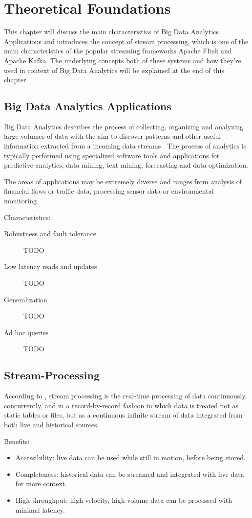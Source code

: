\chapter{Theoretical Foundations}

This chapter will discuss the main characteristics of Big Data Analytics Applications and
introduces the concept of stream processing, which is one of the main characteristics of the
popular streaming frameworks Apache Flink and Apache Kafka. The underlying concepts both of
these systems and how they're used in context of Big Data Analytics will be explained at the
end of this chapter.

\section{Big Data Analytics Applications}

Big Data Analytics describes the process of collecting, organizing and analyzing large volumes
of data with the aim to discover patterns and other useful information extracted from a incoming
data streams \cite{Marz15}. The process of analytics is typically performed using specialized software tools and
applications for predictive analytics, data mining, text mining, forecasting and data optimization.

The areas of applications may be extremely diverse and ranges from analysis of financial flows or
traffic data, processing sensor data or environmental monitoring.

Characteristics:
\begin{description}
    \item [Robustness and fault tolerance] TODO
    \item [Low latency reads and updates] TODO
    \item [Generalization] TODO
    \item [Ad hoc queries] TODO
\end{description}

\section{Stream-Processing}
According to \cite{Klepp16}, stream processing is the real-time processing of data continuously,
concurrently, and in a record-by-record fashion in which data is treated not as static tables
or files, but as a continuous infinite stream of data integrated from both live and historical
sources.

Benefits:
\begin{itemize}
	\item Accessibility: live data can be used while still in motion, before being stored.
	\item Completeness: historical data can be streamed and integrated with live data for more context.
	\item High throughput: high-velocity, high-volume data can be processed with minimal latency.
\end{itemize}

